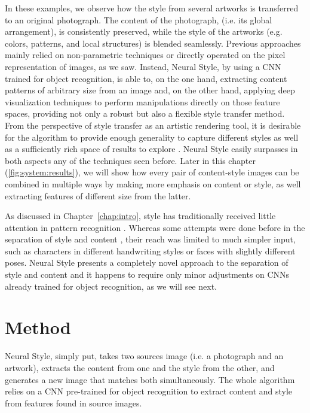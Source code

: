 In these examples, we observe how the style from several artworks is transferred to an original photograph.
The content of the photograph, (i.e. its global arrangement), is consistently preserved, while the style of the artworks (e.g. colors, patterns, and local structures) is blended seamlessly.
Previous approaches mainly relied on non-parametric techniques or directly operated on the pixel representation of images, as we saw.
Instead, Neural Style, by using a CNN trained for object recognition, is able to, on the one hand, extracting content patterns of arbitrary size from an image and, on the other hand, applying deep visualization techniques to perform manipulations directly on those feature spaces, providing not only a robust but also a flexible style transfer method.
From the perspective of style transfer as an artistic rendering tool, it is desirable for the algorithm to provide enough generality to capture different styles as well as a sufficiently rich space of results to explore \cite{Ashikhmin2003}.
Neural Style easily surpasses in both aspects any of the techniques seen before.
Later in this chapter (\autoref{fig:system:results}), we will show how every pair of content-style images can be combined in multiple ways by making more emphasis on content or style, as well extracting features of different size from the latter.

As discussed in Chapter~\ref{chap:intro}, style has traditionally received little attention in pattern recognition \cite{Karayev2014}.
Whereas some attempts were done before in the separation of style and content \cite{Tenenbaum2000,Elgammal2004}, their reach was limited to much simpler input, such as characters in different handwriting styles or faces with slightly different poses.
Neural Style presents a completely novel approach to the separation of style and content and it happens to require only minor adjustments on CNNs already trained for object recognition, as we will see next.



\section{Method}
\label{sec:system:method}

Neural Style, simply put, takes two sources image (i.e. a photograph and an artwork), extracts the content from one and the style from the other, and generates a new image that matches both simultaneously.
The whole algorithm relies on a CNN pre-trained for object recognition to extract content and style from features found in source images.


